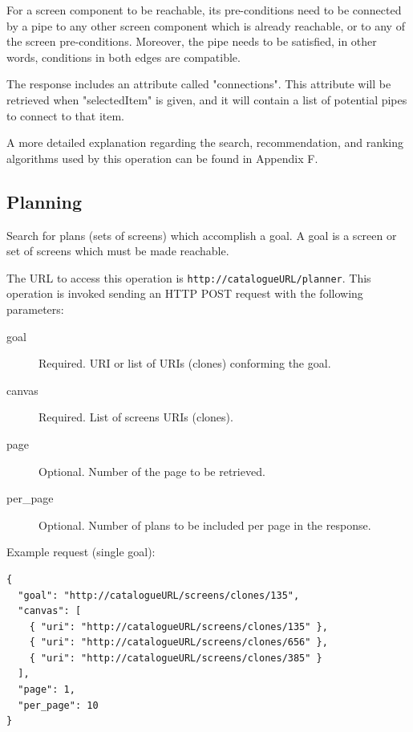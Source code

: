 \documentclass{fast_latex}
\begin{document}
For a screen component to be reachable, its pre-conditions need to be connected by a pipe to any other screen component which is already reachable, or to any of the screen pre-conditions. Moreover, the pipe needs to be satisfied, in other words, conditions in both edges are compatible.

The response includes an attribute called "connections". This attribute will be retrieved when "selectedItem" is given, and it will contain a list of potential pipes to connect to that item.

A more detailed explanation regarding the search, recommendation, and ranking algorithms used by this operation can be found in Appendix F.



\subsection{Planning}
\label{sub:planning}

Search for plans (sets of screens) which accomplish a goal. A goal is a screen or set of screens which must be made reachable.

The URL to access this operation is \verb|http://catalogueURL/planner|. This operation is invoked sending an HTTP POST request with the following parameters:

\begin{description}
	\item[goal] Required. URI or list of URIs (clones) conforming the goal.
	\item[canvas] Required. List of screens URIs (clones).
	\item[page] Optional. Number of the page to be retrieved.
	\item[per\_page] Optional. Number of plans to be included per page in the response.
\end{description}

Example request (single goal):

\singlespacing
\begin{verbatim}
{
  "goal": "http://catalogueURL/screens/clones/135",
  "canvas": [
    { "uri": "http://catalogueURL/screens/clones/135" },
    { "uri": "http://catalogueURL/screens/clones/656" },
    { "uri": "http://catalogueURL/screens/clones/385" }
  ],
  "page": 1,
  "per_page": 10 
}
\end{verbatim}
\doublespacing
\end{document}

